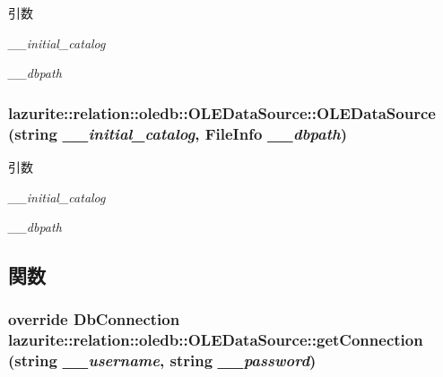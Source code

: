 \begin{DoxyParams}{引数}
\item[{\em \_\-\_\-initial\_\-catalog}]\item[{\em \_\-\_\-dbpath}]\end{DoxyParams}
\hypertarget{classlazurite_1_1relation_1_1oledb_1_1_o_l_e_data_source_a4685074d67dafaa0dbf017987be8b1a1}{
\subsubsection[{OLEDataSource}]{\setlength{\rightskip}{0pt plus 5cm}lazurite::relation::oledb::OLEDataSource::OLEDataSource (string {\em \_\-\_\-initial\_\-catalog}, \/  FileInfo {\em \_\-\_\-dbpath})}}
\label{classlazurite_1_1relation_1_1oledb_1_1_o_l_e_data_source_a4685074d67dafaa0dbf017987be8b1a1}

\begin{DoxyParams}{引数}
\item[{\em \_\-\_\-initial\_\-catalog}]\item[{\em \_\-\_\-dbpath}]\end{DoxyParams}


\subsection{関数}
\hypertarget{classlazurite_1_1relation_1_1oledb_1_1_o_l_e_data_source_a8bcb0954e47ca8ec4c117ade3e9f0ce9}{
\subsubsection[{getConnection}]{\setlength{\rightskip}{0pt plus 5cm}override DbConnection lazurite::relation::oledb::OLEDataSource::getConnection (string {\em \_\-\_\-username}, \/  string {\em \_\-\_\-password})}}
\label{classlazurite_1_1relation_1_1oledb_1_1_o_l_e_data_source_a8bcb0954e47ca8ec4c117ade3e9f0ce9}


